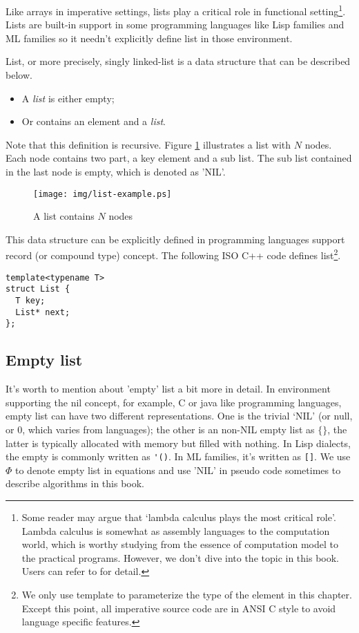 \documentclass{article}
\begin{document}
Like arrays in imperative settings, lists play a critical role in functional setting\footnote{Some 
reader may argue that `lambda calculus plays the most critical role'.
Lambda calculus is somewhat as assembly languages to the computation world, which 
is worthy studying from the essence of computation model to the practical programs.
However, we don't dive into the topic in this book. Users can refer to \cite{mittype}
for detail.}. Lists are built-in support in some programming languages like Lisp
families and ML families so it needn't explicitly define list in those environment.

List, or more precisely, singly linked-list is a data structure that can be described
below.

\begin{itemize}
\item A {\em list} is either empty;
\item Or contains an element and a {\em list}.
\end{itemize}

Note that this definition is recursive. Figure \ref{fig:list-example} illustrates
a list with $N$ nodes. Each node contains two part, a key element and a sub list. The
sub list contained in the last node is empty, which is denoted as 'NIL'.

\begin{figure}[htbp]
        \centering
        \texttt{[image: img/list-example.ps]}
        \caption{A list contains $N$ nodes} \label{fig:list-example}
\end{figure}

This data structure can be explicitly defined in programming languages support record
(or compound type) concept. The following ISO C++ code defines list\footnote{We only use
template to parameterize the type of the element in this chapter. Except this point,
all imperative source code are in ANSI C style to avoid language specific features.}.

\lstset{language=C++}
\begin{lstlisting}
template<typename T>
struct List {
  T key;
  List* next;
};
\end{lstlisting}

\subsection{Empty list}
It's worth to mention about 'empty' list a bit more in detail. In environment supporting the
nil concept, for example, C or java like programming languages, empty list can have two
different representations. One is the trivial `NIL' (or null, or 0, which varies from languages);
the other is an non-NIL empty list as $\{ \}$, the latter is typically allocated with
memory but filled with nothing. In Lisp dialects, the empty is commonly written as \verb|'()|.
In ML families, it's written as \verb|[]|. We use $\Phi$ to denote empty list in equations
and use 'NIL' in pseudo code sometimes to describe algorithms in this book.
\end{document}
